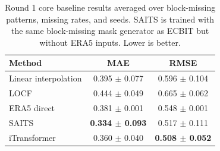 \begin{table}[t]
  \centering
  \caption{Round 1 core baseline results averaged over block-missing patterns, missing rates, and seeds. SAITS is trained with the same block-missing mask generator as ECBIT but without ERA5 inputs. Lower is better.}
  \label{tab:round1-baselines}
  \begin{tabular}{lcc}
    \toprule
    Method & MAE & RMSE \\
    \midrule
    Linear interpolation & 0.395 $\pm$ 0.077 & 0.596 $\pm$ 0.104 \\
    LOCF & 0.444 $\pm$ 0.049 & 0.665 $\pm$ 0.062 \\
    ERA5 direct & 0.381 $\pm$ 0.001 & 0.548 $\pm$ 0.001 \\
    SAITS & \textbf{0.334 $\pm$ 0.093} & 0.517 $\pm$ 0.111 \\
    iTransformer & 0.360 $\pm$ 0.040 & \textbf{0.508 $\pm$ 0.052} \\
    \bottomrule
  \end{tabular}
\end{table}

